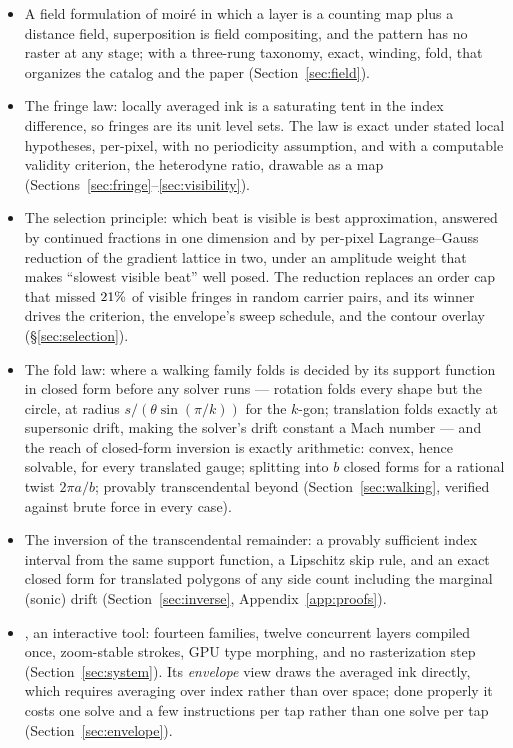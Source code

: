 \begin{itemize}
  \item A field formulation of moir\'e in which a layer is a counting map plus
  a distance field, superposition is field compositing, and the pattern has no
  raster at any stage; with a three-rung taxonomy, exact, winding, fold, that
  organizes the catalog and the paper (Section~\ref{sec:field}).

  \item The fringe law: locally averaged ink is a saturating tent in the index
  difference, so fringes are its unit level sets. The law is exact under stated
  local hypotheses, per-pixel, with no periodicity assumption, and with a computable
  validity criterion, the heterodyne ratio, drawable as a map
  (Sections~\ref{sec:fringe}--\ref{sec:visibility}).

  \item The selection principle: which beat is visible is best approximation,
  answered by continued fractions in one dimension and by per-pixel
  Lagrange--Gauss reduction of the gradient lattice in two, under an amplitude
  weight that makes ``slowest visible beat'' well posed. The reduction
  replaces an order cap that missed $21\%$ of visible fringes in
  random carrier pairs, and its winner drives the criterion, the envelope's
  sweep schedule, and the contour overlay (\S\ref{sec:selection}).

  \item The fold law: where a walking family folds is decided by its support
  function in closed form before any solver runs --- rotation folds every
  shape but the circle, at radius $s/(\theta\sin(\pi/k))$ for the $k$-gon;
  translation folds exactly at supersonic drift, making the solver's drift
  constant a Mach number --- and the reach of closed-form inversion is
  exactly arithmetic: convex, hence solvable, for every translated gauge;
  splitting into $b$ closed forms for a rational twist $2\pi a/b$; provably
  transcendental beyond (Section~\ref{sec:walking}, verified against brute
  force in every case).

  \item The inversion of the transcendental remainder: a provably sufficient
  index interval from the same support function, a Lipschitz skip rule, and
  an exact closed form for translated polygons of any side count including
  the marginal (sonic) drift (Section~\ref{sec:inverse},
  Appendix~\ref{app:proofs}).

  \item \Moire{}, an interactive tool: fourteen families, twelve concurrent
  layers compiled once, zoom-stable strokes, GPU type morphing, and no
  rasterization step (Section~\ref{sec:system}). Its \emph{envelope} view draws
  the averaged ink directly, which requires averaging over index rather than
  over space; done properly it costs one solve and a few instructions per tap
  rather than one solve per tap (Section~\ref{sec:envelope}).


\end{itemize}
